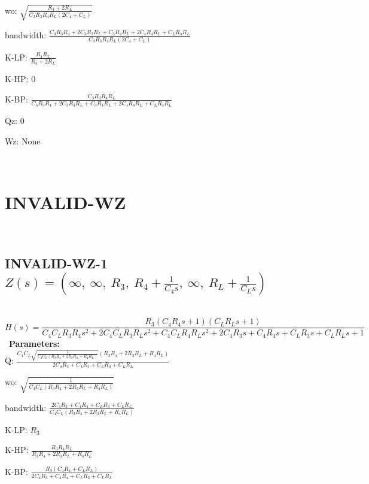 \documentclass{article}
\begin{document}
wo: $\sqrt{\frac{R_{4} + 2 R_{L}}{C_{3} R_{3} R_{4} R_{L} \left(2 C_{4} + C_{L}\right)}}$\ 

bandwidth: $\frac{C_{3} R_{3} R_{4} + 2 C_{3} R_{3} R_{L} + C_{3} R_{4} R_{L} + 2 C_{4} R_{4} R_{L} + C_{L} R_{4} R_{L}}{C_{3} R_{3} R_{4} R_{L} \left(2 C_{4} + C_{L}\right)}$\ 

K-LP: $\frac{R_{4} R_{L}}{R_{4} + 2 R_{L}}$\ 

K-HP: $0$\ 

K-BP: $\frac{C_{3} R_{3} R_{4} R_{L}}{C_{3} R_{3} R_{4} + 2 C_{3} R_{3} R_{L} + C_{3} R_{4} R_{L} + 2 C_{4} R_{4} R_{L} + C_{L} R_{4} R_{L}}$\ 

Qz: $0$\ 

Wz: $\text{None}$\ 

\ 

\section{INVALID-WZ}\ 
\subsection{INVALID-WZ-1 $Z(s) = \left( \infty, \  \infty, \  R_{3}, \  R_{4} + \frac{1}{C_{4} s}, \  \infty, \  R_{L} + \frac{1}{C_{L} s}\right)$ } \ 
\textbf{\[H(s) = \frac{R_{3} \left(C_{4} R_{4} s + 1\right) \left(C_{L} R_{L} s + 1\right)}{C_{4} C_{L} R_{3} R_{4} s^{2} + 2 C_{4} C_{L} R_{3} R_{L} s^{2} + C_{4} C_{L} R_{4} R_{L} s^{2} + 2 C_{4} R_{3} s + C_{4} R_{4} s + C_{L} R_{3} s + C_{L} R_{L} s + 1}\] } \ 
\textbf{Parameters:}\\ 

Q: $\frac{C_{4} C_{L} \sqrt{\frac{1}{C_{4} C_{L} \left(R_{3} R_{4} + 2 R_{3} R_{L} + R_{4} R_{L}\right)}} \left(R_{3} R_{4} + 2 R_{3} R_{L} + R_{4} R_{L}\right)}{2 C_{4} R_{3} + C_{4} R_{4} + C_{L} R_{3} + C_{L} R_{L}}$\ 

wo: $\sqrt{\frac{1}{C_{4} C_{L} \left(R_{3} R_{4} + 2 R_{3} R_{L} + R_{4} R_{L}\right)}}$\ 

bandwidth: $\frac{2 C_{4} R_{3} + C_{4} R_{4} + C_{L} R_{3} + C_{L} R_{L}}{C_{4} C_{L} \left(R_{3} R_{4} + 2 R_{3} R_{L} + R_{4} R_{L}\right)}$\ 

K-LP: $R_{3}$\ 

K-HP: $\frac{R_{3} R_{4} R_{L}}{R_{3} R_{4} + 2 R_{3} R_{L} + R_{4} R_{L}}$\ 

K-BP: $\frac{R_{3} \left(C_{4} R_{4} + C_{L} R_{L}\right)}{2 C_{4} R_{3} + C_{4} R_{4} + C_{L} R_{3} + C_{L} R_{L}}$\ 
\end{document}

